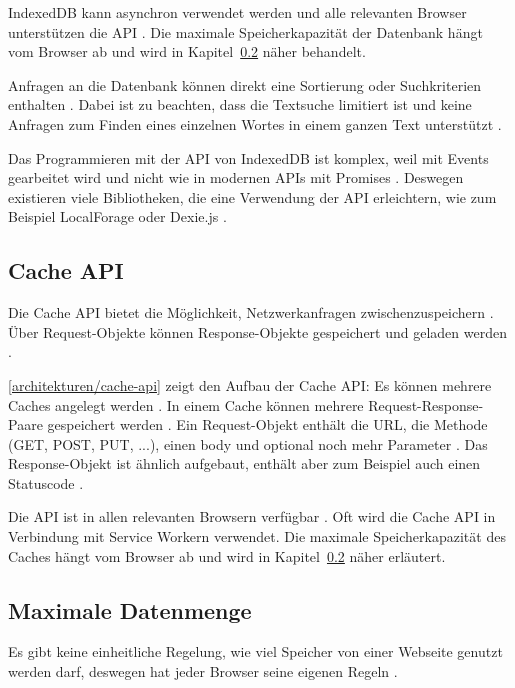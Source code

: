 
IndexedDB kann asynchron verwendet werden \autocite{Hajian2019} \autocite{mdn-indexeddb} und alle relevanten Browser unterstützen die \ac{API} \autocite{mdn-indexeddb-api}. Die maximale Speicherkapazität der Datenbank hängt vom Browser ab und wird in Kapitel~\ref{Kap4:Datenmenge} näher behandelt.

Anfragen an die Datenbank können direkt eine Sortierung oder Suchkriterien enthalten \autocite{mdn-indexeddb}. Dabei ist zu beachten, dass die Textsuche limitiert ist und keine Anfragen zum Finden eines einzelnen Wortes in einem ganzen Text unterstützt \autocite{mdn-indexeddb}. 

Das Programmieren mit der \ac{API} von IndexedDB ist komplex, weil mit Events gearbeitet wird und nicht wie in modernen \acp{API} mit Promises \autocite{Hajian2019}. Deswegen existieren viele Bibliotheken, die eine Verwendung der \ac{API} erleichtern, wie zum Beispiel LocalForage oder Dexie.js \autocite{Hajian2019} \autocite{mdn-indexeddb}.

\subsection{Cache API}
Die Cache \ac{API} bietet die Möglichkeit, Netzwerkanfragen zwischenzuspeichern \autocite{mdn-cache-api}. Über Request-Objekte können Response-Objekte gespeichert und geladen werden \autocite{mdn-cache-api}.


\autoref{architekturen/cache-api} zeigt den Aufbau der Cache \ac{API}: Es können mehrere Caches angelegt werden \autocite{mdn-cache-api}. In einem Cache können mehrere Request-Response-Paare gespeichert werden \autocite{mdn-cache-api}. Ein Request-Objekt enthält die URL, die Methode (GET, POST, PUT, ...), einen body und optional noch mehr Parameter \autocite{mdn-request}. Das Response-Objekt ist ähnlich aufgebaut, enthält aber zum Beispiel auch einen Statuscode \autocite{mdn-response}.

Die \ac{API} ist in allen relevanten Browsern verfügbar \autocite{mdn-cache-api}. Oft wird die Cache \ac{API} in Verbindung mit Service Workern verwendet. Die maximale Speicherkapazität des Caches hängt vom Browser ab und wird in Kapitel~\ref{Kap4:Datenmenge} näher erläutert. 

\subsection{Maximale Datenmenge}
\label{Kap4:Datenmenge}
Es gibt keine einheitliche Regelung, wie viel Speicher von einer Webseite genutzt werden darf, deswegen hat jeder Browser seine eigenen Regeln \autocite{storage-for-the-web}. 

